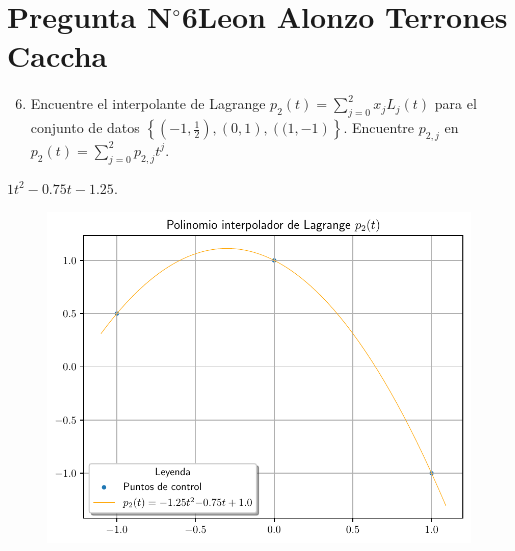 \section{Pregunta N$^{\circ}$6\qquad Leon Alonzo Terrones Caccha}




\begin{frame}
	\begin{enumerate}\setcounter{enumi}{5}
		\item

		      Encuentre el interpolante de Lagrange
		      \begin{math}
			      p_{2}\left(t\right)=
			      \sum\limits_{j=0}^{2}
			      x_{j}
			      L_{j}\left(t\right)
		      \end{math}
		      para el conjunto de datos
		      \begin{math}
			      \left\{
			      \left(-1,\frac{1}{2}\right),
			      \left(0,1\right),
			      \left((1,-1\right)
			      \right\}
		      \end{math}.
		      Encuentre $p_{2,j}$ en
		      \begin{math}
			      p_{2}\left(t\right)=
			      \sum\limits_{j=0}^{2}
			      p_{2,j}t^{j}
		      \end{math}.
	\end{enumerate}

	\begin{solution}

		$1t^{2}-0.75t-1.25$.

		\begin{figure}[ht!]
			\centering
			\includegraphics[width=.6\paperwidth]{p6}
		\end{figure}
	\end{solution}
\end{frame}

